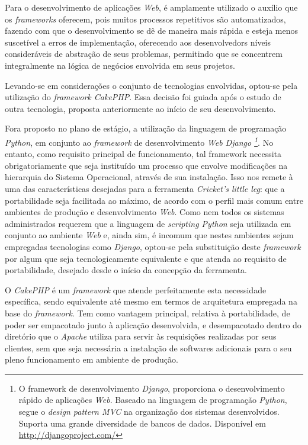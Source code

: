 Para o desenvolvimento de aplicações \textit{Web}, é amplamente utilizado o auxílio que os \textit{frameworks} oferecem, pois muitos processos repetitivos são automatizados, fazendo com que o desenvolvimento se dê de maneira mais rápida e esteja menos suscetível a erros de implementação, oferecendo aos desenvolvedors níveis consideráveis de abstração de seus problemas, permitindo que se concentrem integralmente na lógica de negócios envolvida em seus projetos.

Levando-se em considerações o conjunto de tecnologias envolvidas, optou-se pela utilização do \textit{framework CakePHP}. Essa decisão foi guiada após o estudo de outra tecnologia, proposta anteriormente ao início de seu desenvolvimento.

Fora proposto no plano de estágio, a utilização da linguagem de programação \textit{Python}, em conjunto ao \textit{framework} de desenvolvimento \textit{Web Django \footnote{O framework de desenvolvimento \textit{Django}, proporciona o desenvolvimento rápido de aplicações \textit{Web}. Baseado na linguagem de programação \textit{Python}, segue o \textit{design pattern MVC} na organização dos sistemas desenvolvidos. Suporta uma grande diversidade de bancos de dados. Disponível em \url{http://djangoproject.com/}}}. No entanto, como requisito principal de funcionamento, tal framework necessita obrigatoriamente que seja instituído um processo que envolve modificações na hierarquia do Sistema Operacional, através de sua instalação. Isso nos remete à uma das características desejadas para a ferramenta \textit{Cricket's little leg}: que a portabilidade seja facilitada ao máximo, de acordo com o perfil mais comum entre ambientes de produção e desenvolvimento \textit{Web}. Como nem todos os sistemas administrados requerem que a linguagem de \textit{scripting Python} seja utilizada em conjunto ao ambiente \textit{Web} e, ainda sim, é incomum que nestes ambientes sejam empregadas tecnologias como \textit{Django}, optou-se pela substituição deste \textit{framework} por algum que seja tecnologicamente equivalente e que atenda ao requisito de portabilidade, desejado desde o início da concepção da ferramenta.

O \textit{CakePHP} é um \textit{framework} que atende perfeitamente esta necessidade específica, sendo equivalente até mesmo em termos de arquitetura empregada na base do \textit{framework}. Tem como vantagem principal, relativa à portabilidade, de poder ser empacotado junto à aplicação desenvolvida, e desempacotado dentro do diretório que o \textit{Apache} utiliza para servir às requisições realizadas por seus clientes, sem que seja necessária a instalação de softwares adicionais para o seu pleno funcionamento em ambiente de produção.

